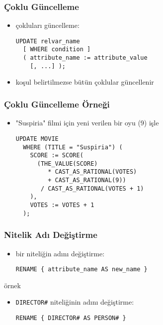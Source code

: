 \documentclass[dvipsnames]{beamer}
\theoremstyle{plain}
\begin{document}
\begin{frame}[fragile]
  \frametitle{Çoklu Güncelleme}
  
  \begin{itemize}
    \item çokluları güncelleme:
    \begin{lstlisting}
UPDATE relvar_name
  [ WHERE condition ]
  ( attribute_name := attribute_value
    [, ...] );
    \end{lstlisting}

    \item koşul belirtilmezse bütün çoklular güncellenir
  \end{itemize}
\end{frame}

\begin{frame}[fragile]
  \frametitle{Çoklu Güncelleme Örneği}
  
  \begin{itemize}
    \item "Suspiria" filmi için yeni verilen bir oyu (9) işle
    \begin{lstlisting}
UPDATE MOVIE
  WHERE (TITLE = "Suspiria") (
    SCORE := SCORE(
      (THE_VALUE(SCORE)
         * CAST_AS_RATIONAL(VOTES)
         + CAST_AS_RATIONAL(9))
       / CAST_AS_RATIONAL(VOTES + 1)
    ),
    VOTES := VOTES + 1
  );
    \end{lstlisting}
  \end{itemize}
\end{frame}

\begin{frame}[fragile]
  \frametitle{Nitelik Adı Değiştirme}

  \begin{itemize}
    \item bir niteliğin adını değiştirme:
    \begin{lstlisting}
RENAME { attribute_name AS new_name }
    \end{lstlisting}
  \end{itemize}

  \medskip
  \begin{exampleblock}{örnek}
    \begin{itemize}
      \item \texttt{DIRECTOR\#} niteliğinin adını değiştirme:
      \begin{lstlisting}
RENAME { DIRECTOR# AS PERSON# }
      \end{lstlisting}
    \end{itemize}
  \end{exampleblock}
\end{frame}
\end{document}
